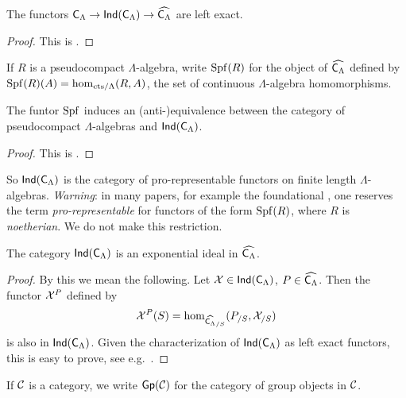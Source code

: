 \begin{lemma}\label{lem:ind-cat-left-exact}
The functors $\mathsf{C}_\Lambda \to \operatorname{\mathsf{Ind}}(\mathsf{C}_\Lambda) \to \widehat{\mathsf{C}_\Lambda}$ 
are left exact.
\end{lemma}
\begin{proof}
This is \cite[6.1.17]{kashiwara-schapira-2006}. 
\end{proof}

If $R$ is a pseudocompact $\Lambda$-algebra, write $\operatorname{Spf}(R)$ for the object of 
$\widehat{\mathsf{C}_\Lambda}$ defined by $\operatorname{Spf}(R)(A)=\hom_{\mathrm{cts}/\Lambda}(R,A)$, 
the set of continuous $\Lambda$-algebra homomorphisms. 

\begin{lemma}
The funtor $\operatorname{Spf}$ induces an (anti-)equivalence between the category of 
pseudocompact $\Lambda$-algebras and $\operatorname{\mathsf{Ind}}(\mathsf{C}_\Lambda)$. 
\end{lemma}
\begin{proof}
This is \cite[VII\textsubscript{B} 0.4.2 Prop.]{sga3-1}. 
\end{proof}

So $\operatorname{\mathsf{Ind}}(\mathsf{C}_\Lambda)$ is the category of pro-representable 
functors on finite length $\Lambda$-algebras. \emph{Warning}: in many papers, 
for example the foundational \cite{mazur-1995}, one reserves the term 
\emph{pro-representable} for functors of the form $\operatorname{Spf}(R)$, where $R$ is 
\emph{noetherian}. We do not make this restriction. 

\begin{lemma}\label{thm:exponential-ideal}
The category $\operatorname{\mathsf{Ind}}(\mathsf{C}_\Lambda)$ is an exponential ideal in 
$\widehat{\mathsf{C}_\Lambda}$. 
\end{lemma}
\begin{proof}
By this we mean the following. Let $\mathcal{X}\in \operatorname{\mathsf{Ind}}(\mathsf{C}_\Lambda)$, 
$P\in \widehat{\mathsf{C}_\Lambda}$. Then the functor $\mathcal{X}^P$ defined by 
\[
	\mathcal{X}^P(S) = \hom_{\widehat{\mathsf{C}_\Lambda}_{/S}}(P_{/S},\mathcal{X}_{/S}) 
\]
is also in $\operatorname{\mathsf{Ind}}(\mathsf{C}_\Lambda)$. Given the characterization of 
$\operatorname{\mathsf{Ind}}(\mathsf{C}_\Lambda)$ as left exact functors, this is easy to 
prove, see e.g.~\cite[4.2.3]{johnstone-2002}. 
\end{proof}

If $\mathcal{C}$ is a category, we write $\operatorname{\mathsf{Gp}}(\mathcal{C})$ for the category of group 
objects in $\mathcal{C}$. 

